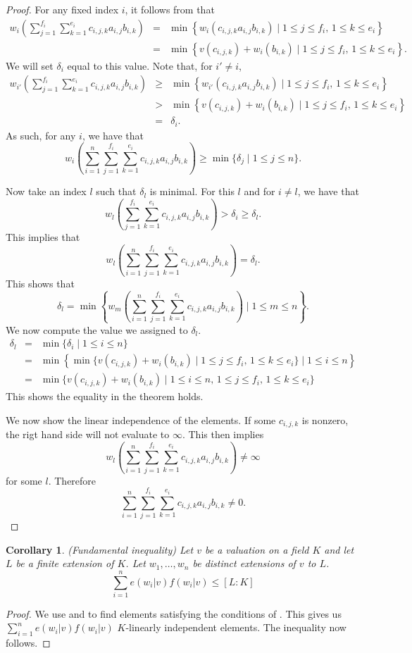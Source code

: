 \documentclass[12pt,a4paper]{amsart}
\newtheorem{cor}[thm]{Corollary}
\theoremstyle{definition}
\begin{document}
\begin{proof}
For any fixed index $i$, it follows from  that
\begin{eqnarray*}
w_i\left(\sum_{j=1}^{f_i}\sum_{k=1}^{e_i}c_{i,j,k}a_{i,j}b_{i,k}\right)&=&\min\left\{w_i(c_{i,j,k}a_{i,j}b_{i,k})\mid1\leq j\leq f_i,\, 1\leq k\leq e_i\right\}\\
&=&\min\left\{v(c_{i,j,k})+w_i(b_{i,k})\mid1\leq j\leq f_i,\, 1\leq k\leq e_i\right\}.
\end{eqnarray*}
We will set $\delta_i$ equal to this value.
Note that, for $i'\neq i$,
\begin{eqnarray*}
w_{i'}\left(\sum_{j=1}^{f_i}\sum_{k=1}^{e_i}c_{i,j,k}a_{i,j}b_{i,k}\right)&\geq&\min\left\{w_{i'}(c_{i,j,k}a_{i,j}b_{i,k})\mid1\leq j\leq f_i,\, 1\leq k\leq e_i\right\}\\
&>&\min\left\{v(c_{i,j,k})+w_i(b_{i,k})\mid1\leq j\leq f_i,\, 1\leq k\leq e_i\right\}\\
&=&\delta_i.
\end{eqnarray*}
As such, for any $i$, we have that
$$w_i\left(\sum_{i=1}^n\sum_{j=1}^{f_i}\sum_{k=1}^{e_i}c_{i,j,k}a_{i,j}b_{i,k}\right)\geq\min\{\delta_j\mid1\leq j\leq n\}.$$

Now take an index $l$ such that $\delta_l$ is minimal.
For this $l$ and for $i\neq l$, we have that
$$w_l\left(\sum_{j=1}^{f_i}\sum_{k=1}^{e_i}c_{i,j,k}a_{i,j}b_{i,k}\right)>\delta_i\geq\delta_l.$$
This implies that
$$w_l\left(\sum_{i=1}^n\sum_{j=1}^{f_i}\sum_{k=1}^{e_i}c_{i,j,k}a_{i,j}b_{i,k}\right)=\delta_l.$$
This shows that $$\delta_l=\min\left\{w_m\left(\sum_{i=1}^n\sum_{j=1}^{f_i}\sum_{k=1}^{e_i}c_{i,j,k}a_{i,j}b_{i,k}\right)\mid1\leq m\leq n\right\}.$$
We now compute the value we assigned to $\delta_l$.
\begin{eqnarray*}
\delta_l&=&\min\{\delta_i\mid1\leq i\leq n\}\\
&=&\min\left\{\min\{v(c_{i,j,k})+w_i(b_{i,k})\mid1\leq j\leq f_i,\, 1\leq k\leq e_i\}\mid1\leq i\leq n\right\}\\
&=&\min\{v(c_{i,j,k})+w_i(b_{i,k})\mid1\leq i\leq n,\,1\leq j\leq f_i,\, 1\leq k\leq e_i\}
\end{eqnarray*}
This shows the equality in the theorem holds.

We now show the linear independence of the elements.
If some $c_{i,j,k}$ is nonzero, the rigt hand side will not evaluate to $\infty$.
This then implies $$w_l\left(\sum_{i=1}^n\sum_{j=1}^{f_i}\sum_{k=1}^{e_i}c_{i,j,k}a_{i,j}b_{i,k}\right)\neq\infty$$
for some $l$.
Therefore $$\sum_{i=1}^n\sum_{j=1}^{f_i}\sum_{k=1}^{e_i}c_{i,j,k}a_{i,j}b_{i,k}\neq0.$$
\end{proof}
\begin{cor}{\label{fun}}(Fundamental inequality)
Let $v$ be a valuation on a field $K$ and let $L$ be a finite extension of $K$.
Let $w_1,\ldots,w_n$ be distinct extensions of $v$ to $L$.
$$\sum_{i=1}^ne(w_i|v)f(w_i|v)\leq [L:K]$$
\end{cor}
\begin{proof}
We use  and  to find elements satisfying the conditions of .
This gives us $\sum_{i=1}^ne(w_i|v)f(w_i|v)$ $K$-linearly independent elements.
The inequality now follows.
\end{proof}

\clearpage
\printbibliography
\end{document}
